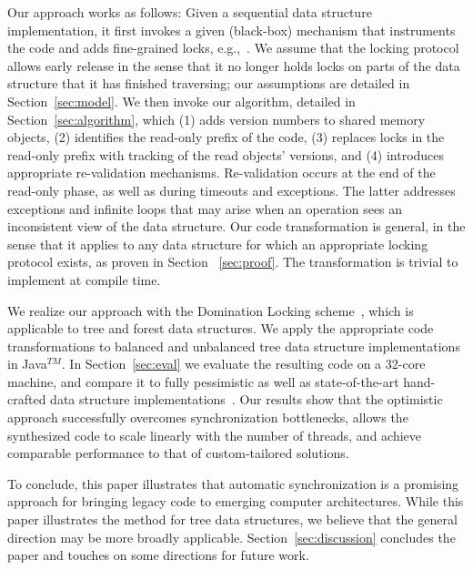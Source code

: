 Our approach works as follows: Given a sequential data structure
implementation, it first invokes a given (black-box) mechanism that
instruments the code and adds  fine-grained locks,
e.g.,~\cite{domination,tree-locking,dag}. We assume that the locking
protocol allows early release in the sense that it no longer holds locks
on parts of the data structure that it has finished traversing; our
assumptions are detailed in Section~\ref{sec:model}. We then invoke our
algorithm, detailed in Section~\ref{sec:algorithm}, which (1) adds
version numbers to shared memory objects, (2) identifies the read-only
prefix of the code, (3) replaces locks in the read-only prefix with
tracking of the read objects' versions, and (4) introduces appropriate
re-validation mechanisms.  Re-validation occurs at the end of the
read-only phase, as well as during timeouts and exceptions. The latter
addresses exceptions and infinite loops that may arise when an operation
sees an inconsistent view of the data structure. Our code transformation
is general, in the sense that it applies to any data structure for which
an appropriate locking protocol exists, as proven in Section
~\ref{sec:proof}. The transformation is trivial to implement at compile
time.

We realize our approach with the Domination Locking
scheme~\cite{domination}, which is applicable to tree and forest data
structures. We apply the appropriate code transformations to balanced
and unbalanced tree data structure implementations in Java$^{TM}$. In
Section~\ref{sec:eval} we evaluate the resulting code on a 32-core
machine, and compare it to fully pessimistic as well as state-of-the-art
hand-crafted data structure implementations~\cite{dana,bronson}. Our
results show that the optimistic approach successfully overcomes
synchronization bottlenecks, allows the synthesized code to scale
linearly with the number of threads, and achieve comparable performance
to that of custom-tailored solutions.

To conclude, this paper illustrates that automatic synchronization is a
promising approach for bringing legacy code to emerging computer
architectures. While this paper illustrates the method for tree data
structures, we believe that the general direction may be more broadly
applicable.
Section~\ref{sec:discussion} concludes the paper and touches on some
directions for future work.













